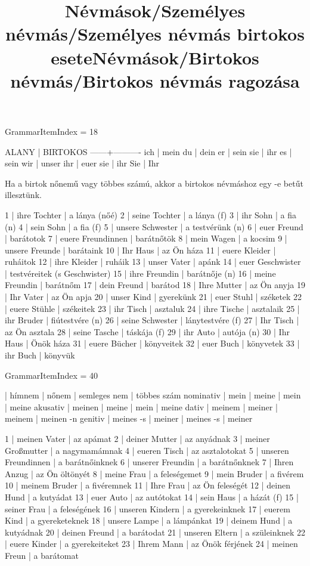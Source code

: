 \title{Névmások/Személyes névmás/Személyes névmás birtokos esete}

GrammarItemIndex = 18

\begin{desc}
ALANY | BIRTOKOS 
------+----------
ich   | mein
du    | dein
er    | sein
sie   | ihr
es    | sein
wir   | unser
ihr   | euer
sie   | ihr
Sie   | Ihr

Ha a birtok nőnemű vagy többes számú, akkor a birtokos névmáshoz
egy -e betűt illesztünk.
\end{desc}

\begin{exmp}
1 | ihre Tochter | a lánya (nőé)
2 | seine Tochter | a lánya (f)
3 | ihr Sohn | a fia (n)
4 | sein Sohn | a fia (f)
5 | unsere Schwester | a testvérünk (n)
6 | euer Freund | barátotok
7 | euere Freundinnen | barátnőtök
8 | mein Wagen | a kocsim
9 | unsere Freunde | barátaink
10 | Ihr Haus | az Ön háza
11 | euere Kleider | ruháitok
12 | ihre Kleider | ruháik
13 | unser Vater | apánk
14 | euer Geschwister | testvéreitek (s Geschwister)
15 | ihre Freundin | barátnője (n)
16 | meine Freundin | barátnőm
17 | dein Freund | barátod
18 | Ihre Mutter | az Ön anyja
19 | Ihr Vater | az Ön apja
20 | unser Kind | gyerekünk
21 | euer Stuhl | széketek
22 | euere Stühle | székeitek
23 | ihr Tisch | asztaluk
24 | ihre Tische | asztalaik
25 | ihr Bruder | fiútestvére (n)
26 | seine Schwester | lánytestvére (f)
27 | Ihr Tisch | az Ön asztala
28 | seine Tasche | táskája (f)
29 | ihr Auto | autója (n)
30 | Ihr Haus | Önök háza
31 | euere Bücher | könyveitek
32 | euer Buch | könyvetek
33 | ihr Buch | könyvük
\end{exmp}

\title{Névmások/Birtokos névmás/Birtokos névmás ragozása}

GrammarItemIndex = 40

\begin{desc}
          | hímnem    | nőnem  | semleges nem | többes szám 
nominativ | mein      | meine  | mein         | meine 
akusativ  | meinen    | meine  | mein         | meine 
dativ     | meinem    | meiner | meinem       | meinen -n 
genitiv   | meines -s | meiner | meines -s    | meiner 
\end{desc}

\begin{exmp}
1 | meinen Vater | az apámat
2 | deiner Mutter | az anyádnak
3 | meiner Großmutter | a nagymamámnak
4 | eueren Tisch | az asztalotokat
5 | unseren Freundinnen | a barátnőinknek
6 | unserer Freundin | a barátnőnknek
7 | Ihren Anzug | az Ön öltönyét
8 | meine Frau | a feleségemet
9 | mein Bruder | a fivérem
10 | meinem Bruder | a fivéremnek
11 | Ihre Frau | az Ön feleségét
12 | deinen Hund | a kutyádat
13 | euer Auto | az autótokat
14 | sein Haus | a házát (f)
15 | seiner Frau | a feleségének
16 | unseren Kindern | a gyerekeinknek
17 | euerem Kind | a gyereketeknek
18 | unsere Lampe | a lámpánkat
19 | deinem Hund | a kutyádnak
20 | deinen Freund | a barátodat
21 | unseren Eltern | a szüleinknek
22 | euere Kinder | a gyerekeiteket
23 | Ihrem Mann | az Önök férjének
24 | meinen Freun | a barátomat
\end{exmp}

